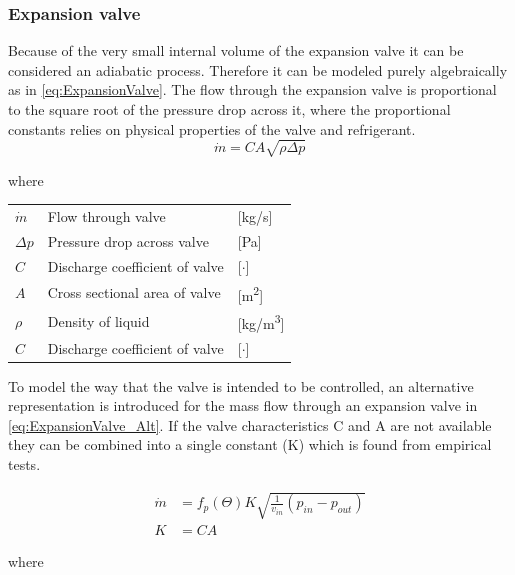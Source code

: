 \subsubsection{Expansion valve}
Because of the very small internal volume of the expansion valve it can be considered an adiabatic process. Therefore it can be modeled purely algebraically as in \cref{eq:ExpansionValve}. The flow through the expansion valve is proportional to the square root of the pressure drop across it, where the proportional constants relies on physical properties of the valve and refrigerant.
\begin{equation} \label{eq:ExpansionValve}
	\dot{m}= C A \sqrt{\rho\Delta p}
\end{equation}

where
\begin{center}
	\begin{tabular}{l p{8cm} l}
		$\dot{m}$ 	& Flow through valve & [\si{kg}/\si{s}]\\
		$\Delta p$ 	& Pressure drop across valve & [\si{Pa}]\\
		$C$ 		& Discharge coefficient of valve & [$\cdot$]\\
		$A$	 		& Cross sectional area of valve & [\si{m^2}]\\
		$\rho$ 		& Density of liquid & [\si{kg}/\si{m^3}]\\
			$C$ 	& Discharge coefficient of valve & [$\cdot$]\\
	\end{tabular}
\end{center}

To model the way that the valve is intended to be controlled, an alternative representation is introduced for the mass flow through an expansion valve in \cref{eq:ExpansionValve_Alt}. If the valve characteristics C and A are not available they can be combined into a single constant (K) which is found from empirical tests.


\begin{equation} \label{eq:ExpansionValve_Alt}
	\begin{split}
		\dot{m} & = f_p(\Theta) K  \sqrt{\frac{1}{v_{in}} (p_{in} - p_{out})} \\
		K       & = C A
	\end{split}
\end{equation}

where

